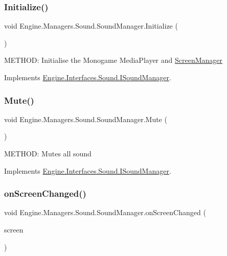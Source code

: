 \subsubsection{\texorpdfstring{Initialize()}{Initialize()}}
{\footnotesize\ttfamily void Engine.\+Managers.\+Sound.\+Sound\+Manager.\+Initialize (\begin{DoxyParamCaption}{ }\end{DoxyParamCaption})\hspace{0.3cm}{\ttfamily [inline]}}



M\+E\+T\+H\+OD\+: Initialise the Monogame Media\+Player and \hyperlink{a00538}{Screen\+Manager} 



Implements \hyperlink{a00482_a02f14f3401f425a686a50e6b6a40aca7}{Engine.\+Interfaces.\+Sound.\+I\+Sound\+Manager}.

\mbox{\label{a00546_a5a3a9b96e6708deedf2c4939b3259011}} 
\subsubsection{\texorpdfstring{Mute()}{Mute()}}
{\footnotesize\ttfamily void Engine.\+Managers.\+Sound.\+Sound\+Manager.\+Mute (\begin{DoxyParamCaption}{ }\end{DoxyParamCaption})\hspace{0.3cm}{\ttfamily [inline]}}



M\+E\+T\+H\+OD\+: Mutes all sound 



Implements \hyperlink{a00482_a5bcad4d517b37a12b17e59d0b927ca37}{Engine.\+Interfaces.\+Sound.\+I\+Sound\+Manager}.

\mbox{\label{a00546_a8dfbb15525871b87e6cdcf744b070139}} 
\subsubsection{\texorpdfstring{on\+Screen\+Changed()}{onScreenChanged()}}
{\footnotesize\ttfamily void Engine.\+Managers.\+Sound.\+Sound\+Manager.\+on\+Screen\+Changed (\begin{DoxyParamCaption}\item[{\hyperlink{a00550}{Base\+Screen}}]{screen }\end{DoxyParamCaption})\hspace{0.3cm}{\ttfamily [inline]}}




